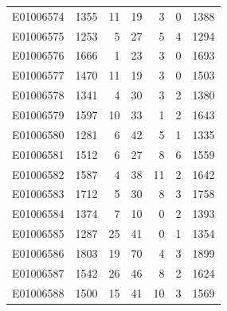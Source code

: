 \documentclass[
  letterpaper,
  DIV=11,
  numbers=noendperiod]{scrreprt}
\begin{document}
\begin{tabular}{lrrrrrr}
E01006574     &    1355 &      11 &                    19 &                               3 &                       0 &              1388 \\
E01006575     &    1253 &       5 &                    27 &                               5 &                       4 &              1294 \\
E01006576     &    1666 &       1 &                    23 &                               3 &                       0 &              1693 \\
E01006577     &    1470 &      11 &                    19 &                               3 &                       0 &              1503 \\
E01006578     &    1341 &       4 &                    30 &                               3 &                       2 &              1380 \\
E01006579     &    1597 &      10 &                    33 &                               1 &                       2 &              1643 \\
E01006580     &    1281 &       6 &                    42 &                               5 &                       1 &              1335 \\
E01006581     &    1512 &       6 &                    27 &                               8 &                       6 &              1559 \\
E01006582     &    1587 &       4 &                    38 &                              11 &                       2 &              1642 \\
E01006583     &    1712 &       5 &                    30 &                               8 &                       3 &              1758 \\
E01006584     &    1374 &       7 &                    10 &                               0 &                       2 &              1393 \\
E01006585     &    1287 &      25 &                    41 &                               0 &                       1 &              1354 \\
E01006586     &    1803 &      19 &                    70 &                               4 &                       3 &              1899 \\
E01006587     &    1542 &      26 &                    46 &                               8 &                       2 &              1624 \\
E01006588     &    1500 &      15 &                    41 &                              10 &                       3 &              1569 \\

\end{tabular}
\end{document}
